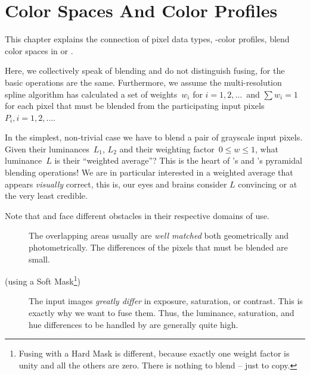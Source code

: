

\chapter[Color Spaces\commonpart]{\label{sec:color-spaces}%
  Color Spaces And Color Profiles\commonpart}

%
%
This chapter explains the connection of pixel data types,
-color profiles, blend color spaces in \App{} or
\OtherApp.

%
%
%
%
Here, we collectively speak of blending and do not distinguish fusing, for the basic operations
are the same.  Furthermore, we assume the multi-resolution spline algorithm has calculated a set
of weights~$w_i$ for $i = 1, 2, \dots$~and $\sum w_i = 1$ for each pixel that must be blended
from the participating input pixels~$P_i, i = 1, 2, \dots$.

%
%
In the simplest, non-trivial case we have to blend a pair of grayscale input pixels.  Given
their luminances~$L_1$, $L_2$ and their weighting factor~$0 \leq w \leq 1$, what luminance~$L$
is their ``weighted average''?  This is the heart of \App's and \OtherApp's pyramidal blending
operations!  We are in particular interested in a weighted average that appears \emph{visually}
correct, this is, our eyes and brains consider $L$ convincing or at the very least credible.

\begin{geeknote}
  \noindent Note that \App{} and \OtherApp{} face different obstacles in their respective
  domains of use.

  \begin{description}
  \item[]\itemend
    The overlapping areas usually are \emph{well matched} both geometrically and
    photometrically.  The differences of the pixels that must be blended are small.

  \item[ (using a Soft Mask\footnote{Fusing with a Hard Mask is different,
      because exactly one weight factor is unity and all the others are zero.  There is nothing
      to blend -- just to copy.})]\itemend
    The input images \emph{greatly differ} in exposure, saturation, or contrast.  This is
    exactly why we want to fuse them.  Thus, the luminance, saturation, and hue differences to
    be handled by  are generally quite high.
  \end{description}
\end{geeknote}

